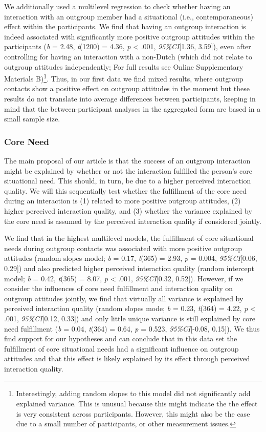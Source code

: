 We additionally used a multilevel regression to check whether having an
interaction with an outgroup member had a situational (i.e.,
contemporaneous) effect within the participants. We find that having an
outgroup interaction is indeed associated with significantly more
positive outgroup attitudes within the participants (\textit{b} = 2.48,
\textit{t}(1200) = 4.36, \textit{p} \textless{} .001,
\textit{95\%CI}{[}1.36, 3.59{]}), even after controlling for having an
interaction with a non-Dutch (which did not relate to outgroup attitudes
independently; For full results see Online Supplementary Materials
B)\footnote{Interestingly, adding random slopes to this model did not significantly add explained variance. This is unusual because this might indicate the the effect is very consistent across participants. However, this might also be the case due to a small number of participants, or other measurement issues.}.
Thus, in our first data we find mixed results, where outgroup contacts
show a positive effect on outgroup attitudes in the moment but these
results do not translate into average differences between participants,
keeping in mind that the between-participant analyses in the aggregated
form are based in a small sample size.

\subsubsection{Core Need}

The main proposal of our article is that the success of an outgroup
interaction might be explained by whether or not the interaction
fulfilled the person's core situational need. This should, in turn, be
due to a higher perceived interaction quality. We will this sequentially
test whether the fulfillment of the core need during an interaction is
(1) related to more positive outgroup attitudes, (2) higher perceived
interaction quality, and (3) whether the variance explained by the core
need is assumed by the perceived interaction quality if considered
jointly.

We find that in the highest multilevel models, the fulfillment of core
situational needs during outgroup contacts was associated with more
positive outgroup attitudes (random slopes model; \textit{b} = 0.17,
\textit{t}(365) = 2.93, \textit{p} = 0.004, \textit{95\%CI}{[}0.06,
0.29{]}) and also predicted higher perceived interaction quality (random
intercept model; \textit{b} = 0.42, \textit{t}(365) = 8.07, \textit{p}
\textless{} .001, \textit{95\%CI}{[}0.32, 0.52{]}). However, if we
consider the influences of core need fulfillment and interaction quality
on outgroup attitudes jointly, we find that virtually all variance is
explained by perceived interaction quality (random slopes mode;
\textit{b} = 0.23, \textit{t}(364) = 4.22, \textit{p} \textless{} .001,
\textit{95\%CI}{[}0.12, 0.33{]}) and only little unique variance is
still explained by core need fulfillment (\textit{b} = 0.04,
\textit{t}(364) = 0.64, \textit{p} = 0.523, \textit{95\%CI}{[}-0.08,
0.15{]}). We thus find support for our hypotheses and can conclude that
in this data set the fulfillment of core situational needs had a
significant influence on outgroup attitudes and that this effect is
likely explained by its effect through perceived interaction quality.

